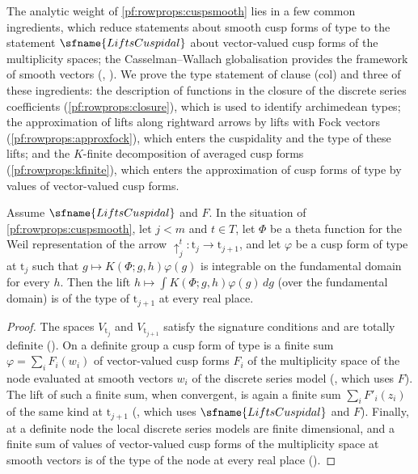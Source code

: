 The analytic weight of \cref{pf:rowprops:cuspsmooth} lies in a few common ingredients, which reduce statements about
smooth cusp forms of type to the statement $\sfname{LiftsCuspidal}$ about vector-valued cusp forms of the multiplicity
spaces; the Casselman--Wallach globalisation provides the framework of smooth vectors
(, \cite{Casselman1989,Wallach1992}). We prove the type statement of
clause (col) and three of these ingredients: the description of functions in the closure of the discrete series coefficients
(\cref{pf:rowprops:closure}), which is used to identify archimedean types; the approximation of lifts along rightward arrows by
lifts with Fock vectors (\cref{pf:rowprops:approxfock}), which enters the cuspidality and the type of these lifts; and the
$K$-finite decomposition of averaged cusp forms (\cref{pf:rowprops:kfinite}), which enters the approximation of cusp forms of
type by values of vector-valued cusp forms.

\begin{proposition}\label{pf:rowprops:coltype}
Assume $\sfname{LiftsCuspidal}$ and $F$. In the situation of \cref{pf:rowprops:cuspsmooth}, let $j<m$ and $t\in T$, let $\Phi$ be a
theta function for the Weil representation of the arrow $\uparrow^t_j:\mathrm t_j\to\mathrm t_{j+1}$, and let $\varphi$ be a cusp
form of type at $\mathrm t_j$ such that $g\mapsto K(\Phi;g,h)\varphi(g)$ is integrable on the fundamental domain for every $h$.
Then the lift $h\mapsto\int K(\Phi;g,h)\varphi(g)\,dg$ (over the fundamental domain) is of the type of $\mathrm t_{j+1}$ at every
real place.
\end{proposition}

\begin{proof}
The spaces $V_{\mathrm t_j}$ and $V_{\mathrm t_{j+1}}$ satisfy the signature conditions and are totally definite
(). On a definite group a cusp form of type is a finite sum
$\varphi=\sum_iF_i(w_i)$ of vector-valued cusp forms $F_i$ of the multiplicity space of the node evaluated at smooth vectors
$w_i$ of the discrete series model (, which uses $F$). The
lift of such a finite sum, when convergent, is again a finite sum $\sum_iF'_i(z_i)$ of the same kind at $\mathrm t_{j+1}$
(, which uses $\sfname{LiftsCuspidal}$ and $F$). Finally, at a definite
node the local discrete series models are finite dimensional, and a finite sum of values of vector-valued cusp forms of the
multiplicity space at smooth vectors is of the type of the node at every real place
().
\end{proof}

